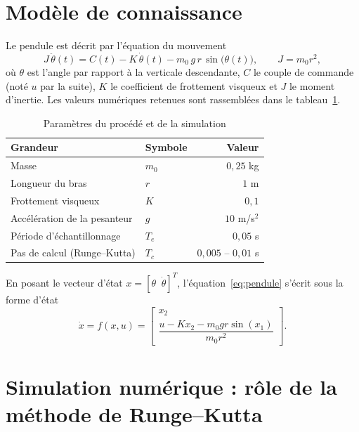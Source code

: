 \documentclass[11pt,a4paper]{report}
\begin{document}
\section{Modèle de connaissance}

Le pendule est décrit par l'équation du mouvement
\begin{equation}
  J\,\ddot{\theta}(t) = C(t) - K\,\dot{\theta}(t) - m_0\,g\,r\,\sin\big(\theta(t)\big),
  \qquad J = m_0 r^2,
  \label{eq:pendule}
\end{equation}
où $\theta$ est l'angle par rapport à la verticale descendante, $C$ le couple de commande
(noté $u$ par la suite), $K$ le coefficient de frottement visqueux et $J$ le moment d'inertie.
Les valeurs numériques retenues sont rassemblées dans le tableau~\ref{tab:param}.

\begin{table}[htbp]
\centering
\caption{Paramètres du procédé et de la simulation}
\label{tab:param}
\begin{tabular}{llr}
\toprule
Grandeur & Symbole & Valeur \\
\midrule
Masse                       & $m_0$ & $0{,}25$ kg \\
Longueur du bras            & $r$   & $1$ m \\
Frottement visqueux         & $K$   & $0{,}1$ \\
Accélération de la pesanteur& $g$   & $10$ m/s$^2$ \\
Période d'échantillonnage   & $T_e$ & $0{,}05$ s \\
Pas de calcul (Runge--Kutta)& $T_c$ & $0{,}005$ -- $0{,}01$ s \\
\bottomrule
\end{tabular}
\end{table}

En posant le vecteur d'état $x = [\theta\;\; \dot{\theta}]^{T}$, l'équation~\eqref{eq:pendule}
s'écrit sous la forme d'état
\begin{equation}
  \dot{x} = f(x,u) =
  \begin{bmatrix} x_2 \\[2pt] \dfrac{u - K x_2 - m_0 g r \sin(x_1)}{m_0 r^2}\end{bmatrix}.
\end{equation}

\section{Simulation numérique : rôle de la méthode de Runge--Kutta}
\end{document}
